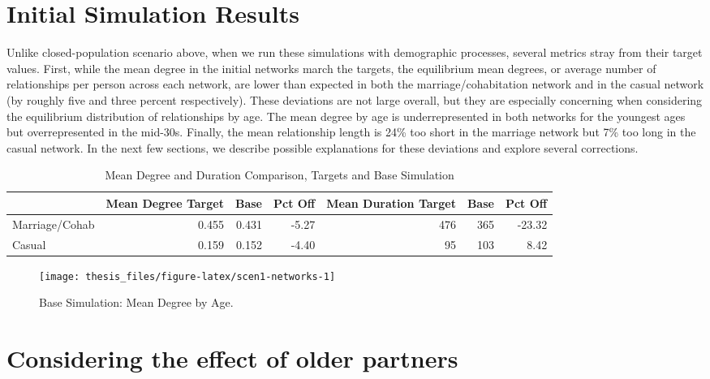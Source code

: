 \documentclass [11pt, proquest] {uwthesis}[2015/03/03]
\begin{document}
\hypertarget{initial-simulation-results}{%
\section{Initial Simulation Results}\label{initial-simulation-results}}

Unlike closed-population scenario above, when we run these simulations with demographic processes, several metrics stray from their target values. First, while the mean degree in the initial networks march the targets, the equilibrium mean degrees, or average number of relationships per person across each network, are lower than expected in both the marriage/cohabitation network and in the casual network (by roughly five and three percent respectively). These deviations are not large overall, but they are especially concerning when considering the equilibrium distribution of relationships by age. The mean degree by age is underrepresented in both networks for the youngest ages but overrepresented in the mid-30s. Finally, the mean relationship length is 24\% too short in the marriage network but 7\% too long in the casual network. In the next few sections, we describe possible explanations for these deviations and explore several corrections.
\begin{table}

\caption{\label{tab:scen1-tab}Mean Degree and Duration Comparison, Targets and Base Simulation}
\centering
\begin{tabular}[t]{lrrrrrr}
\toprule
  & Mean Degree Target & Base & Pct Off & Mean Duration Target & Base & Pct Off\\
\midrule
Marriage/Cohab & 0.455 & 0.431 & -5.27 & 476 & 365 & -23.32\\
Casual & 0.159 & 0.152 & -4.40 & 95 & 103 & 8.42\\
\bottomrule
\end{tabular}
\end{table}
\begin{figure}

{\centering \texttt{[image: thesis\_files/figure-latex/scen1-networks-1]} 

}

\caption{Base Simulation: Mean Degree by Age.}\label{fig:scen1-networks}
\end{figure}
\hypertarget{considering-the-effect-of-older-partners}{%
\section{Considering the effect of older partners}\label{considering-the-effect-of-older-partners}}
\end{document}
